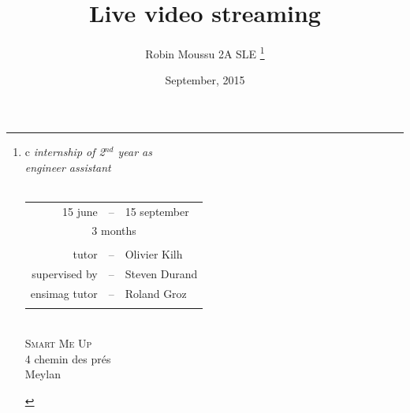 \documentclass[a4paper,11pt]{custom}
\newcommand{\smu}{\textsc{Smart Me Up}}
\begin{document}



\title{
  Live video streaming
}
\author{
  Robin Moussu 2A SLE
  \thanks{
  \begin{tabular}{c}
    \textit{internship of 2$^{nd}$ year as}\\
    \textit{engineer assistant}\\
    \vspace{2em}\\
    \begin{tabular}{rcl}
      15 june &--& 15 september\\
      \multicolumn{3}{c}{3 months}\\
      \\
      tutor &--& Olivier Kilh \\
      supervised by &--& Steven Durand \\
      ensimag tutor &--& Roland Groz\\
      \\
    \end{tabular}
    \vspace{2em}\\
    \smu\\
    4 chemin des prés\\
    Meylan\\
  \end{tabular}
  }
}
\date{
  September, 2015
}
\maketitle

\end{document}
